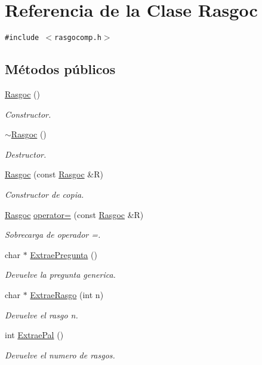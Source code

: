 \hypertarget{class_rasgoc}{
\section{Referencia de la Clase Rasgoc}
\label{class_rasgoc}
}
{\tt \#include $<$rasgocomp.h$>$}

\subsection*{Métodos públicos}
\begin{CompactItemize}
\item 
\hyperlink{class_rasgoc_a1c1f3b173d54f802c40363f717dcffc}{Rasgoc} ()
\begin{CompactList}\small\item\em Constructor. \item\end{CompactList}\item 
\hyperlink{class_rasgoc_efb7fb7a05cd333a18c0b60e5efd9d99}{$\sim$Rasgoc} ()
\begin{CompactList}\small\item\em Destructor. \item\end{CompactList}\item 
\hyperlink{class_rasgoc_40f4540ed941f1b71372b26d53d5d645}{Rasgoc} (const \hyperlink{class_rasgoc}{Rasgoc} \&R)
\begin{CompactList}\small\item\em Constructor de copia. \item\end{CompactList}\item 
\hyperlink{class_rasgoc}{Rasgoc} \hyperlink{class_rasgoc_f22e8b0f99cf942a698b80e058d6b56a}{operator=} (const \hyperlink{class_rasgoc}{Rasgoc} \&R)
\begin{CompactList}\small\item\em Sobrecarga de operador =. \item\end{CompactList}\item 
char $\ast$ \hyperlink{class_rasgoc_d26f42e7cb5d2b59e8b46db90710f105}{ExtraePregunta} ()
\begin{CompactList}\small\item\em Devuelve la pregunta generica. \item\end{CompactList}\item 
char $\ast$ \hyperlink{class_rasgoc_79b6809cdeb33acdc895c0e6afe5edc1}{ExtraeRasgo} (int n)
\begin{CompactList}\small\item\em Devuelve el rasgo n. \item\end{CompactList}\item 
int \hyperlink{class_rasgoc_35dce951c99831bc19ea25a2e768dff6}{ExtraePal} ()
\begin{CompactList}\small\item\em Devuelve el numero de rasgos. \item\end{CompactList}\end{CompactItemize}
